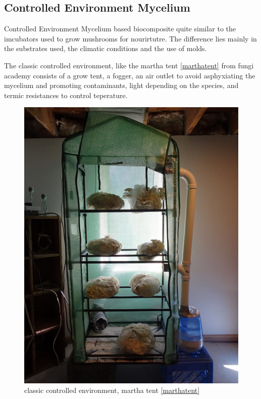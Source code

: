 





\subsection{ Controlled
Environment Mycelium}

Controlled Environment Mycelium based biocomposite quite similar to the imcubators used to grow mushrooms for nourirtutre. The difference lies mainly in the substrates used, the climatic conditions and the use of molds.

The classic controlled environment, like the martha tent \ref{marthatent} 
from fungi academy consists of a grow tent, a fogger, an air outlet to avoid asphyxiating the mycelium and promoting contaminants, light depending on the species, and termic resistances to control teperature.  

\begin{figure}[h]
    \centering
    \includegraphics{images/classicalmyceliumtent.png}
    \caption{classic controlled environment, martha tent \ref{marthatent} }
    \label{fig:marthatent}
\end{figure} 

